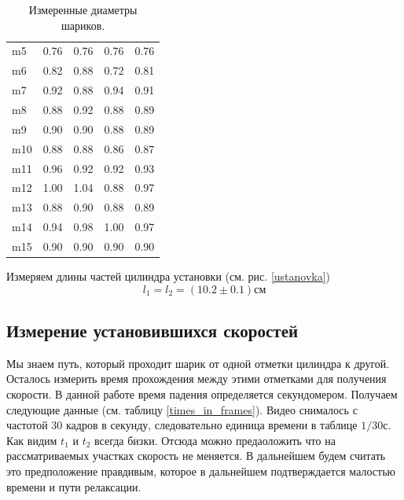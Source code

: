 \documentclass[a4paper, 12pt]{article}
\begin{document}
\begin{table}[h!]
\begin{center}
{\begin{tabular}{|l|rrr|r|}
                m5  & 0.76  & 0.76  & 0.76  & 0.76                \\
                m6  & 0.82  & 0.88  & 0.72  & 0.81                \\
                m7  & 0.92  & 0.88  & 0.94  & 0.91                \\
                m8  & 0.88  & 0.92  & 0.88  & 0.89                \\
                m9  & 0.90  & 0.90  & 0.88  & 0.89                \\
                m10 & 0.88  & 0.88  & 0.86  & 0.87                \\
                m11 & 0.96  & 0.92  & 0.92  & 0.93                \\
                m12 & 1.00  & 1.04  & 0.88  & 0.97                \\
                m13 & 0.88  & 0.90  & 0.88  & 0.89                \\
                m14 & 0.94  & 0.98  & 1.00  & 0.97                \\
                m15 & 0.90  & 0.90  & 0.90  & 0.90                \\
                \hline
            \end{tabular}
        }

        \caption{Измеренные диаметры шариков.}
        \label{diams}
    \end{center}
\end{table}

Измеряем длины частей цилиндра установки (см. рис. \ref{ustanovka})
\begin{equation*} l_1=l_2=(10.2\pm0.1)см \end{equation*}

\subsection{Измерение установившихся скоростей} Мы знаем путь, который проходит
шарик от одной отметки цилиндра к другой. Осталось измерить время прохождения
между этими отметками для получения скорости. В данной работе время падения
определяется секундомером. Получаем следующие данные (см.
таблицу \ref{times_in_frames}). Видео снималось с частотой 30 кадров в секунду,
следовательно единица времени в таблице $1/30 с$. Как видим $t_1$ и $t_2$ всегда
бизки. Отсюда можно предаоложить что на рассматриваемых участках скорость не
меняется. В дальнейшем будем считать это предположение правдивым, которое в
дальнейшем подтверждается малостью времени и пути релаксации.
\end{document}
